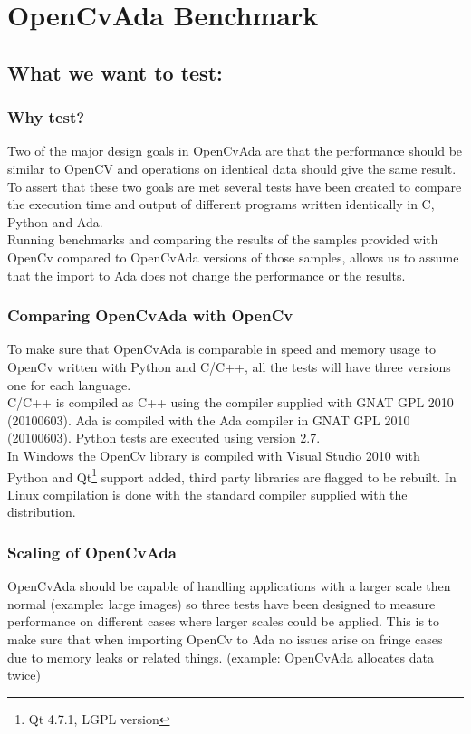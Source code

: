 \chapter{OpenCvAda Benchmark}
\section{What we want to test:}
\subsection{Why test?}
Two of the major design goals in OpenCvAda are that the performance should be similar to OpenCV and operations on identical data should give the same result. To assert that these two goals are met several tests have been created to compare the execution time and output of different programs written identically in C, Python and Ada. 
\\
Running benchmarks and comparing the results of the samples provided with OpenCv compared to OpenCvAda versions of those samples, allows us to assume that the import to Ada does not change the performance or the results.
\subsection{Comparing OpenCvAda with OpenCv}
To make sure that OpenCvAda is comparable in speed and memory usage to OpenCv written with Python and C/C++, all the tests will have three versions one for each language.
\\
C/C++ is compiled as C++ using the compiler supplied with GNAT GPL 2010 (20100603).
Ada is compiled with the Ada compiler in GNAT GPL 2010 (20100603).
Python tests are executed using version 2.7.
\\
In Windows the OpenCv library is compiled with Visual Studio 2010 with Python and Qt\footnote{Qt\cite{qtweb} 4.7.1, LGPL version} support added, third party libraries are flagged to be rebuilt.
In Linux compilation is done with the standard compiler supplied with the distribution.
\subsection{Scaling of OpenCvAda}
OpenCvAda should be capable of handling applications with a larger scale then normal (example: large images) so three tests have been designed to measure performance on different cases where larger scales could be applied. This is to make sure that when importing OpenCv to Ada no issues arise on fringe cases due to memory leaks or related things. (example: OpenCvAda allocates data twice)
